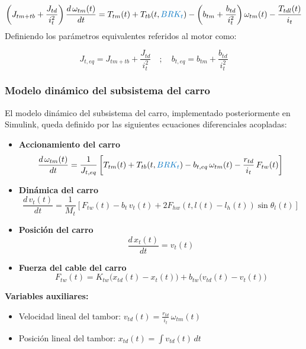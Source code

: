 \documentclass{article}
\begin{document}
\begin{equation}
    \left( J_{tm+tb} + \frac{J_{td}}{i_t^2} \right) \frac{d \, \omega_{tm}(t)}{dt} = T_{tm}(t) + T_{tb}(t,\textcolor{signalcolor}{BRK_t}) - \left( b_{tm} + \frac{b_{td}}{i_t^2} \right) \omega_{tm}(t) - \frac{T_{tdl}(t)}{i_t}
\end{equation}
Definiendo los parámetros equivalentes referidos al motor como:

\begin{equation}
    J_{t,eq} = J_{tm+tb} + \frac{J_{td}}{i_t^2} \quad ; \quad 
    b_{t,eq} = b_{tm} + \frac{b_{td}}{i_t^2}
\end{equation}

\subsubsection{Modelo dinámico del subsistema del carro}
El modelo dinámico del subsistema del carro, implementado posteriormente en Simulink, queda definido por las siguientes ecuaciones diferenciales acopladas:
\begin{itemize}
    \item \textbf{Accionamiento del carro}
    \begin{equation}
        \frac{d\,\omega_{tm}(t)}{dt}
        = \frac{1}{J_{t,eq}}
        \left[
            T_{tm}(t)
            + T_{tb}(t,\textcolor{signalcolor}{BRK_t})
            - b_{t,eq}\,\omega_{tm}(t)
            - \frac{r_{td}}{i_t}\,F_{tw}(t)
        \right]
        \label{eq:accionamiento_carro}
    \end{equation}
    \item \textbf{Dinámica del carro}
    \begin{equation}
        \frac{d\,v_t(t)}{dt}
        = \frac{1}{M_t}
        \left[
            F_{tw}(t)
            - b_t\,v_t(t)
            + 2 F_{hw}(t, l(t)-l_h(t))\sin\theta_l(t)
        \right]
        \label{eq:dinamica_carro}
    \end{equation}
    \item \textbf{Posición del carro}
    \begin{equation}
        \frac{d\,x_t(t)}{dt} = v_t(t)
    \end{equation}
    \item \textbf{Fuerza del cable del carro}
    \begin{equation}
        F_{tw}(t)
        = K_{tw}\bigl(x_{td}(t) - x_t(t)\bigr)
        + b_{tw}\bigl(v_{td}(t) - v_t(t)\bigr)
    \end{equation}
\end{itemize}
\textbf{Variables auxiliares:}
\begin{itemize}
    \item Velocidad lineal del tambor: $v_{td}(t) = \frac{r_{td}}{i_t} \, \omega_{tm}(t)$
    \item Posición lineal del tambor: $x_{td}(t) = \int v_{td}(t) \, dt$
\end{itemize}
\end{document}
